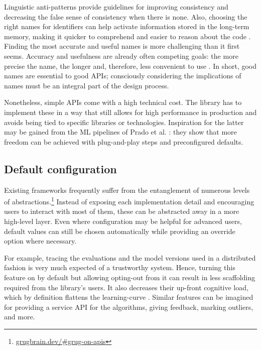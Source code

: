 Linguistic anti-patterns provide guidelines for improving consistency and decreasing the false sense of consistency when there is none. Also, choosing the right names for identifiers can help activate information stored in the long-term memory, making it quicker to comprehend and easier to reason about the code \cite{deissenboeck2006concise}. Finding the most accurate and useful names is more challenging than it first seems. Accuracy and usefulness are already often competing goals: the more precise the name, the longer and, therefore, less convenient to use \cite{butler2009relating}. In short, good names are essential to good APIs; consciously considering the implications of names must be an integral part of the design process.

Nonetheless, simple APIs come with a high technical cost. The library has to implement these in a way that still allows for high performance in production \cite{kleppmann2017designing} and avoids being tied to specific libraries or technologies. Inspiration for the latter may be gained from the ML pipelines of Prado et al. \cite{prado2020bonseyes}: they show that more freedom can be achieved with plug-and-play steps and preconfigured defaults. 

\subsection{Default configuration}

Existing frameworks frequently suffer from the entanglement of numerous levels of abstractions.\footnote{\href{https://grugbrain.dev/\#grug-on-apis}{grugbrain.dev/\#grug-on-apis}} Instead of exposing each implementation detail and encouraging users to interact with most of them, these can be abstracted away in a more high-level layer. Even where configuration may be helpful for advanced users, default values can still be chosen automatically while providing an override option where necessary.

For example, tracing the evaluations and the model versions used in a distributed fashion is very much expected of a trustworthy system. Hence, turning this feature on by default but allowing opting-out from it can result in less scaffolding required from the library's users. It also decreases their up-front cognitive load, which by definition flattens the learning-curve \cite{hermans2021programmer}. Similar features can be imagined for providing a service API for the algorithms, giving feedback, marking outliers, and more.

